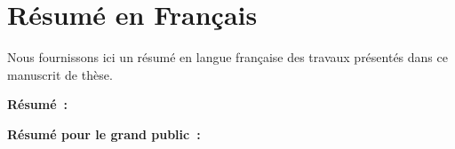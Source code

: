 \chapter{Résumé en Français}
\label{app:fr_long}

Nous fournissons ici un résumé en langue française des travaux présentés dans ce manuscrit de thèse.

\textbf{Résumé~:}

\textbf{Résumé pour le grand public~:}
